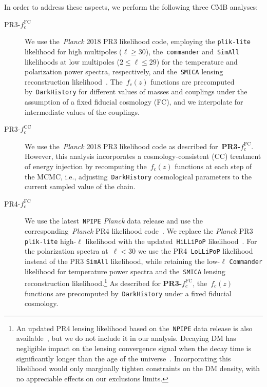 In order to address these aspects, we perform the following three CMB analyses:
\begin{description}
\item[PR3-$f^\mathrm{FC}_c$]
  We use the~\textit{Planck} 2018 PR3 likelihood code, employing the \texttt{plik-lite} likelihood for high multipoles ($\ell \geq 30$), the~\texttt{commander} and~\texttt{SimAll} likelihoods at low multipoles ($2 \leq \ell \leq 29$) for the temperature and polarization power spectra, respectively, and the~\texttt{SMICA} lensing reconstruction likelihood~\cite{Planck:2019nip}.
  The~$f_c(z)$ functions are precomputed by~\texttt{DarkHistory} for different values of masses and couplings under the assumption of a fixed fiducial cosmology (FC), and we interpolate for intermediate values of the couplings.
\item[PR3-$f^\mathrm{CC}_c$]
  We use the~\textit{Planck} 2018 PR3 likelihood code as described for~\textbf{PR3-$f^\mathrm{FC}_c$}.
  However, this analysis incorporates a cosmology-consistent (CC) treatment of energy injection by recomputing the~$f_c(z)$ functions at each step of the MCMC, i.e., adjusting~\texttt{DarkHistory} cosmological parameters to the current sampled value of the chain.
\item[PR4-$f^\mathrm{FC}_c$]
  We use the latest~\texttt{NPIPE} \textit{Planck} data release and use the corresponding~\textit{Planck} PR4 likelihood code~\cite{Planck:2020olo}.
  We replace the \textit{Planck} PR3 \texttt{plik-lite} high-$\ell$ likelihood with the updated~\texttt{HiLLiPoP} likelihood~\cite{Tristram:2023haj}.
  For the polarization spectra at~$\ell < 30$ we use the PR4~\texttt{LoLLiPoP} likelihood~\cite{Tristram:2023haj} instead of the PR3 \texttt{SimAll} likelihood, while retaining the low-$\ell$ \texttt{Commander} likelihood for temperature power spectra and the~\texttt{SMICA} lensing reconstruction likelihood.\footnote{An updated PR4 lensing likelihood based on the~\texttt{NPIPE} data release is also available~\cite{Carron:2022eyg}, but we do not include it in our analysis. Decaying DM has negligible impact on the lensing convergence signal when the decay time is significantly longer than the age of the universe~\cite{Li:2018zdm}. Incorporating this likelihood would only marginally tighten constraints on the DM density, with no appreciable effects on our exclusions limits.}
  As described for \textbf{PR3-$f^\mathrm{FC}_c$}, the~$f_c(z)$ functions are precomputed by~\texttt{DarkHistory} under a fixed fiducial cosmology.
\end{description}

